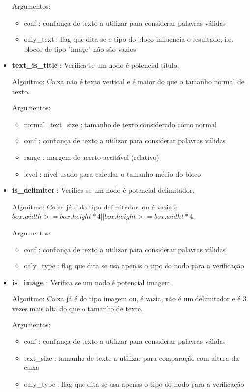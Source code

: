 \begin{itemize}
	Argumentos:
	\begin{itemize}\setlength\itemsep{0.05cm}
		\item conf : confiança de texto a utilizar para considerar palavras válidas
		\item only\_text : flag que dita se o tipo do bloco influencia o resultado, i.e. blocos de tipo "image" não são vazios
	\end{itemize}
	
	
	\item \textbf{text\_is\_title} : Verifica se um nodo é potencial título.
	
	Algoritmo: Caixa não é texto vertical e é maior do que o tamanho normal de texto.
	
	
	Argumentos:
	\begin{itemize}\setlength\itemsep{0.05cm}
		\item normal\_text\_size : tamanho de texto considerado como normal
		\item conf : confiança de texto a utilizar para considerar palavras válidas
		\item range : margem de acerto aceitável (relativo)
		\item level : nível usado para calcular o tamanho médio do bloco
	\end{itemize}
	
	
	\item \textbf{is\_delimiter} : Verifica se um nodo é potencial delimitador.
	
	Algoritmo: Caixa já é do tipo delimitador, ou é vazia e $ box.width >= box.height*4 || box.height >= box.widht*4 $.
	
	
	Argumentos:
	\begin{itemize}\setlength\itemsep{0.05cm}
		\item conf : confiança de texto a utilizar para considerar palavras válidas
		\item only\_type : flag que dita se usa apenas o tipo do nodo para a verificação
	\end{itemize}
	
	
	\item \textbf{is\_image} : Verifica se um nodo é potencial imagem.
	
	Algoritmo: Caixa já é do tipo imagem ou, é vazia, não é um delimitador e é 3 vezes mais alta do que o tamanho de texto.
	
	
	Argumentos:
	\begin{itemize}\setlength\itemsep{0.05cm}
		\item conf : confiança de texto a utilizar para considerar palavras válidas
		\item text\_size : tamanho de texto a utilizar para comparação com altura da caixa
		\item only\_type : flag que dita se usa apenas o tipo do nodo para a verificação
	\end{itemize}
	

\end{itemize}
